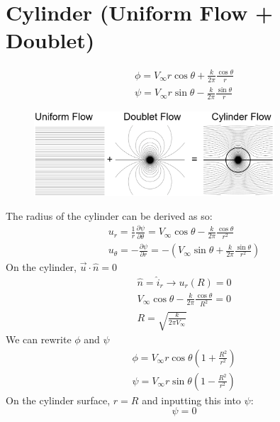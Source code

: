 \documentclass[class=report, crop=false, 12pt,a4paper]{standalone}
\begin{document}
\section{Cylinder (Uniform Flow + Doublet)}
\begin{gather}
  \phi = V_{\infty}r\cos\theta + \frac{k}{2\pi} \frac{\cos\theta}{r}\\
  \psi = V_{\infty} r\sin\theta - \frac{k}{2\pi}\frac{\sin\theta}{r}
\end{gather}
\begin{figure}[H]
  \centering
  \includegraphics[width = 0.8\textwidth]{../img/diagram22.png}
\end{figure}
The radius of the cylinder can be derived as so:
\begin{gather}
  u_r = \frac{1}{r}\frac{\partial \psi}{\partial \theta} = V_{\infty} \cos\theta - \frac{k}{2\pi}\frac{\cos\theta}{r^2}\\
  u_{\theta} = -\frac{\partial \psi}{\partial r} = - \left( V_{\infty} \sin\theta + \frac{k}{2\pi}\frac{\sin\theta}{r^2} \right)
\end{gather}
On the cylinder, $\vec{u}\cdot\hat{n} = 0$
\begin{gather}
  \hat{n} = \hat{i}_r \rightarrow u_r(R)=0\\
  V_{\infty}\cos\theta - \frac{k}{2\pi}\frac{\cos\theta}{R^2} = 0\\
  R = \sqrt{\frac{k}{2\pi V_{\infty}}}
\end{gather}
We can rewrite $\phi$ and $\psi$
\begin{gather}
  \phi = V_{\infty}r\cos\theta\left(1+\frac{R^2}{r^2}\right)\\
  \psi = V_{\infty}r\sin\theta\left(1-\frac{R^2}{r^2}\right)
\end{gather}
On the cylinder surface, $r =R$ and inputting this into $\psi$:
\begin{equation}
  \psi = 0
\end{equation}
\end{document}
